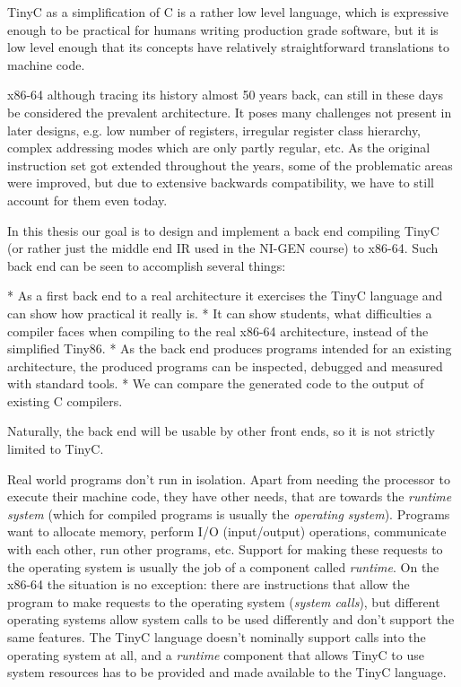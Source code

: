 TinyC as a simplification of C is a rather low level language, which is
expressive enough to be practical for humans writing production grade software,
but it is low level enough that its concepts have relatively straightforward
translations to machine code.

x86-64 although tracing its history almost 50 years back, can still in these
days be considered the prevalent architecture. It poses many challenges not
present in later designs, e.g. low number of registers,
irregular register class hierarchy, complex addressing modes
which are only partly regular, etc. As the original instruction set got extended
throughout the years, some of the problematic areas were improved, but due
to extensive backwards compatibility, we have to still account for them even
today.

In this thesis our goal is to design and implement a back end compiling TinyC
(or rather just the middle end IR used in the NI-GEN course) to x86-64. Such
back end can be seen to accomplish several things:

\begitems
* As a first back end to a real architecture it exercises the TinyC language and
can show how practical it really is.
* It can show students, what difficulties a compiler faces when compiling to the
real x86-64 architecture, instead of the simplified Tiny86.
* As the back end produces programs intended for an existing architecture, the
produced programs can be inspected, debugged and measured with standard
tools.
* We can compare the generated code to the output of existing C compilers.
\enditems

Naturally, the back end will be usable by other front ends, so it is not
strictly limited to TinyC.


Real world programs don't run in isolation. Apart from needing the
processor to execute their machine code, they have other needs, that are towards
the {\em runtime system} (which for compiled programs is usually the {\em
operating system}). Programs want to allocate memory, perform I/O (input/output)
operations, communicate with each other, run other programs, etc. Support for
making these requests to the operating system is usually the job of a component
called {\em runtime}. On the x86-64 the situation is no exception: there are
instructions that allow the program to make requests to the operating system
({\em system calls}), but different operating systems allow system calls to be
used differently and don't support the same features. The TinyC language doesn't
nominally support calls into the operating system at all, and a {\em runtime}
component that allows TinyC to use system resources has to be provided and made
available to the TinyC language.

